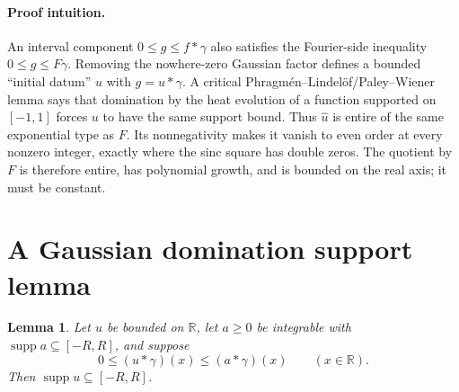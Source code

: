 \documentclass[10pt]{article}
\newtheorem{lemma}{Lemma}
\newcommand{\R}{\mathbb R}
\newcommand{\supp}{\operatorname{supp}}
\begin{document}
\paragraph{Proof intuition.}
An interval component \(0\le g\le f*\gamma\) also satisfies the Fourier-side
inequality \(0\le\widehat g\le F\gamma\).  Removing the nowhere-zero Gaussian
factor defines a bounded ``initial datum'' \(u\) with \(g=u*\gamma\).  A
critical Phragm\'en--Lindel\"of/Paley--Wiener lemma says that domination by
the heat evolution of a function supported on \([-1,1]\) forces \(u\) to
have the same support bound.  Thus \(\widehat u\) is entire of the same
exponential type as \(F\).  Its nonnegativity makes it vanish to even order
at every nonzero integer, exactly where the sinc square has double zeros.
The quotient by \(F\) is therefore entire, has polynomial growth, and is
bounded on the real axis; it must be constant.

\section*{A Gaussian domination support lemma}

\begin{lemma}\label{lem:support}
Let \(u\) be bounded on \(\R\), let \(a\ge0\) be integrable with
\(\supp a\subseteq[-R,R]\), and suppose
\begin{equation}\label{eq:domination}
          0\le (u*\gamma)(x)\le(a*\gamma)(x)\qquad(x\in\R).
\end{equation}
Then \(\supp u\subseteq[-R,R]\).
\end{lemma}
\end{document}

